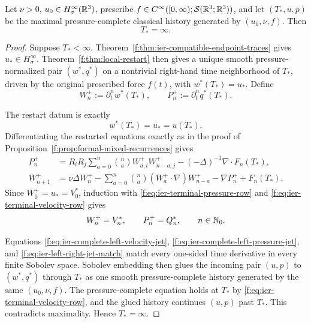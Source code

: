 \begin{theorem}
\label{f:thm:ier-same-history-restart}
Let \(\nu>0\), \(u_0\in H^\infty_\sigma(\mathbb R^3)\), prescribe
\(f\in C^\infty([0,\infty);\mathcal S(\mathbb R^3;\mathbb R^3))\), and let
\((T_*,u,p)\) be the maximal pressure-complete classical history generated
by \((u_0,\nu,f)\).  Then
\begin{equation}
 T_*=\infty.
 \label{f:eq:ier-maximal-time-infinite}
\end{equation}
\end{theorem}

\begin{proof}
Suppose \(T_*<\infty\).  Theorem~\ref{f:thm:ier-compatible-endpoint-traces}
gives \(u_*\in H^\infty_\sigma\).  Theorem~\ref{f:thm:local-restart} then
gives a unique smooth pressure-normalized pair \((w^*,q^*)\) on a nontrivial
right-hand time neighborhood of \(T_*\), driven by the original prescribed
force \(f(t)\), with \(w^*(T_*)=u_*\).  Define
\[
 W_n^+:=\partial_t^nw^*(T_*),
 \qquad
 P_n^+:=\partial_t^nq^*(T_*).
\]
\begin{samepage}
The restart datum is exactly
\[
 w^*(T_*)=u_*=u(T_*).
\]
Differentiating the restarted equations exactly as in the proof of
Proposition~\ref{f:prop:formal-mixed-recurrences} gives
\begin{align*}
 P_n^+&=R_iR_j\sum_{a=0}^{n}\binom naW_{a,i}^+W_{n-a,j}^+
 -(-\Delta)^{-1}\nabla\cdot F_n(T_*),\\
 W_{n+1}^+&=\nu\Delta W_n^+
 -\sum_{a=0}^{n}\binom na(W_a^+\cdot\nabla)W_{n-a}^+
 -\nabla P_n^++F_n(T_*).
\end{align*}
Since \(W_0^+=u_*=V_0^*\), induction with
\eqref{f:eq:ier-terminal-pressure-row} and
\eqref{f:eq:ier-terminal-velocity-row} gives
\begin{equation}
 W_n^+=V_n^*,
 \qquad P_n^+=Q_n^*,
 \qquad n\in\mathbb N_0.
 \label{f:eq:ier-left-right-jet-match}
\end{equation}
\par
\end{samepage}

Equations \eqref{f:eq:ier-complete-left-velocity-jet},
\eqref{f:eq:ier-complete-left-pressure-jet}, and
\eqref{f:eq:ier-left-right-jet-match} match every one-sided time derivative in
every finite Sobolev space.  Sobolev embedding then glues the incoming
pair \((u,p)\) to \((w^*,q^*)\) through \(T_*\) as one smooth
pressure-complete history generated by the same \((u_0,\nu,f)\).  The
pressure-complete equation holds at \(T_*\) by
\eqref{f:eq:ier-terminal-velocity-row}, and the glued history continues
\((u,p)\) past \(T_*\).  This contradicts maximality.  Hence
\(T_*=\infty\).
\end{proof}

